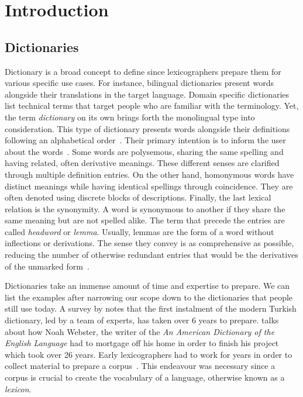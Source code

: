 \chapter{Introduction}\label{chap:introduction}%
\section{Dictionaries}%
\label{sec:dictionaries}
Dictionary is a broad concept to define since lexicographers prepare them for various specific use cases.
For instance, bilingual dictionaries present words alongside their translations in the target language.
Domain specific dictionaries list technical terms that target people who are familiar with the terminology.
Yet, the term \emph{dictionary} on its own brings forth the monolingual type into consideration.
This type of dictionary presents words alongside their definitions following an alphabetical order~\cite{sterkenburg_practical_2003}.
Their primary intention is to inform the user about the words~\cite{uzun_modern_2005}.
Some words are polysemous, sharing the same spelling and having related, often derivative meanings.
These different senses are clarified through multiple definition entries.
On the other hand, homonymous words have distinct meanings while having identical spellings through coincidence.
They are often denoted using discrete blocks of descriptions.
Finally, the last lexical relation is the synonymity.
A word is synonymous to another if they share the same meaning but are not spelled alike.
The term that precede the entries are called \emph{headword} or \emph{lemma}.
Usually, lemmas are the form of a word without inflections or derivations.
The sense they convey is as comprehensive as possible, reducing the number of otherwise redundant entries that would be the derivatives of the unmarked form~\cite{ibrahim_usta_turkce_2006}.

Dictionaries take an immense amount of time and expertise to prepare.
We can list the examples after narrowing our scope down to the dictionaries that people still use today.
A survey by \textcite{uzun_1945ten_1999} notes that the first instalment of the modern Turkish dictionary, led by a team of experts, has taken over 6 years to prepare.
\textcite{kendall_forgotten_2011} talks about how Noah Webster, the writer of the \emph{An American Dictionary of the English Language} had to mortgage off his home in order to finish his project which took over 26 years.
Early lexicographers had to work for years in order to collect material to prepare a corpus~\cite{uzun_1945ten_1999}.
This endeavour was necessary since a corpus is crucial to create the vocabulary of a language, otherwise known as a \emph{lexicon}.

